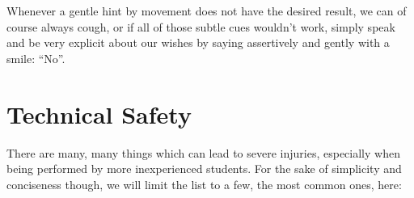 Whenever a gentle hint by movement does not have the desired result, we can of course always cough, or if all of those subtle cues wouldn't work, simply speak and be very explicit about our wishes by saying assertively and gently with a smile: ``No''.

\section{Technical Safety}\label{sec:technical-safety}

There are many, many things which can lead to severe injuries, especially when being performed by more inexperienced students.
For the sake of simplicity and conciseness though, we will limit the list to a few, the most common ones, here:

